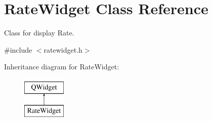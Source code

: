 \hypertarget{classRateWidget}{\section{Rate\+Widget Class Reference}
\label{classRateWidget}
}


Class for display Rate.  




{\ttfamily \#include $<$ratewidget.\+h$>$}

Inheritance diagram for Rate\+Widget\+:\begin{figure}[H]
\begin{center}
\leavevmode
\includegraphics[height=2.000000cm]{dc/da5/classRateWidget}
\end{center}
\end{figure}
